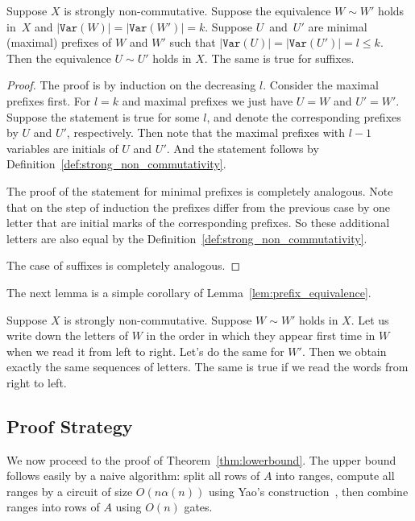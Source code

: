 \documentclass[review,onefignum,onetabnum]{siamart190516}
\newcommand{\var}{\texttt{Var}}
\begin{document}
\begin{lemma} \label{lem:prefix_equivalence}
Suppose $X$ is strongly non-commutative. Suppose the equivalence $W \sim W'$
holds in~$X$ and $|\var(W)|=|\var(W')|=k$. Suppose $U$~and~$U'$ are minimal
(maximal) prefixes of $W$ and $W'$ such that $|\var(U)| = |\var(U')| = l\leq k$.
Then the equivalence $U \sim U'$ holds in $X$. The same is true for suffixes.
\end{lemma}

\begin{proof}
The proof is by induction on the decreasing $l$. Consider the maximal prefixes
first. For $l=k$ and maximal prefixes we just have $U=W$ and $U'=W'$. Suppose
the statement is true for some $l$, and denote the corresponding prefixes by $U$
and $U'$, respectively. Then note that the maximal prefixes with $l-1$ variables
are initials of $U$ and $U'$. And the statement follows by
Definition~\ref{def:strong_non_commutativity}.

The proof of the statement for minimal prefixes is completely analogous. Note
that on the step of induction the prefixes differ from the previous case by one
letter that are initial marks of the corresponding prefixes. So these additional
letters are also equal by the Definition~\ref{def:strong_non_commutativity}.

The case of suffixes is completely analogous.
\end{proof}

The next lemma is a simple corollary of Lemma~\ref{lem:prefix_equivalence}.
\begin{lemma} \label{lem:variables_order}
Suppose $X$ is strongly non-commutative. Suppose $W \sim W'$ holds in $X$. Let
us write down the letters of $W$ in the order in which they appear first time in
$W$ when we read it from left to right. Let's do the same for $W'$. Then we
obtain exactly the same sequences of letters.
%
The same is true if we read the words from right to left.
\end{lemma}

\subsection{Proof Strategy}

We now proceed to the proof of Theorem~\ref{thm:lowerbound}. The upper bound
follows easily by a naive algorithm: split all rows of $A$ into ranges, compute
all ranges by a circuit of size $O(n\alpha(n))$ using Yao's
construction~\cite{DBLP:conf/stoc/Yao82}, then combine ranges into rows of $A$
using $O(n)$ gates.
\end{document}
